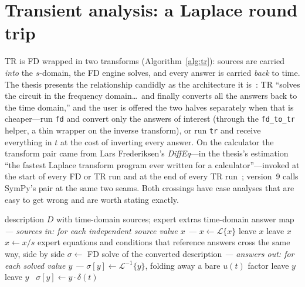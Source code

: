 \documentclass[11pt,oneside]{report}
\newcommand{\kw}[1]{\textsc{#1}}
\newcommand{\code}[1]{\texttt{#1}}
\begin{document}
\section{Transient analysis: a Laplace round trip}
\label{sec:tr}

TR is FD wrapped in two transforms (Algorithm~\ref{alg:tr}): sources
are carried \emph{into} the $s$-domain, the FD engine solves, and
every answer is carried \emph{back} to time. The thesis presents the
relationship candidly as the architecture it
is~\cite[\S11.1--11.2]{thesis2000}: TR ``solves the circuit in the
frequency domain\ldots\ and finally converts all the answers back to
the time domain,'' and the user is offered the two halves separately
when that is cheaper---run \code{fd} and convert only the answers of
interest (through the \code{fd\_to\_tr} helper, a thin wrapper on
the inverse transform), or run \code{tr} and receive everything in
$t$ at the cost of inverting every answer. On the calculator the
transform pair came from Lars Frederiksen's \emph{DiffEq}---in the
thesis's estimation ``the fastest Laplace transform program ever
written for a calculator''---invoked at the start of every FD or TR
run and at the end of every TR run~\cite[\S11.1.1]{thesis2000};
version~9 calls SymPy's pair at the same two seams. Both crossings
have case analyses that are easy to get wrong and are worth stating
exactly.

\begin{algorithm}[htbp]
\caption{\kw{TR}: transient analysis via the $s$-domain}
\label{alg:tr}
\begin{algorithmic}[1]
\Require description $D$ with time-domain sources; expert extras
\Ensure time-domain answer map
\Statex \emph{--- sources in: for each independent source value $x$ ---}
  $x \gets \mathcal{L}\{x\}$
  leave $x$
  leave $x$
\Else
  \ $x \gets x/s$
\EndIf
\State expert equations and conditions that reference answers cross
  the same way, side by side
\State $\sigma \gets$ FD solve of the converted description
  \Comment{initial conditions live in the \code{l}/\code{c} stamps}
\Statex \emph{--- answers out: for each solved value $y$ ---}
  $\sigma[y] \gets \mathcal{L}^{-1}\{y\}$, folding away a bare
  $u(t)$ factor
  leave $y$
  leave $y$
\Else
  \ $\sigma[y] \gets y \cdot \delta(t)$
\EndIf
\end{algorithmic}
\end{algorithm}
\end{document}
